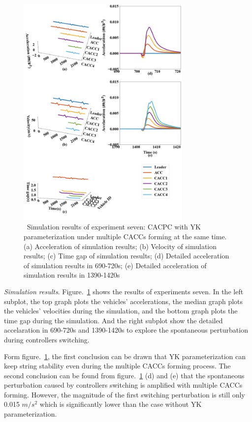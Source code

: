\documentclass[journal]{IEEEtran}
\begin{document}
\begin{figure}[htb]
  \centering
  \includegraphics[width=8.5cm]{figs/extendfig7.png}
  \caption{~Simulation results of experiment seven: CACPC with YK parameterization under multiple CACCs forming at the same time. (a) Acceleration of simulation results; (b) Velocity of simulation results; (c) Time gap of simulation results; (d) Detailed acceleration of simulation results in 690-720s; (e) Detailed acceleration of simulation results in 1390-1420s}
  \label{extend7}
\end{figure}

\textit{Simulation results}. Figure.~\ref{extend7} shows the results of experiments seven. In the left subplot, the top graph plots the vehicles' accelerations, the median graph plots the vehicles' velocities during the simulation, and the bottom graph plots the time gap during the simulation. And the right subplot show the detailed accelaration in 690-720s and 1390-1420s to explore the spontaneous perturbation during controllers switching.

Form figure.~\ref{extend7}, the first conclusion can be drawn that YK parameterization can keep string stability even during the multiple CACCs forming process. The second conclusion can be found from figure.~\ref{extend7} (d) and (e) that the spontaneous perturbation caused by controllers switching is amplified with multiple CACCs forming. However, the magnitude of the first switching perturbation is still only 0.015 $m/s^2$ which is significantly lower than the case without YK parameterization.
\end{document}
